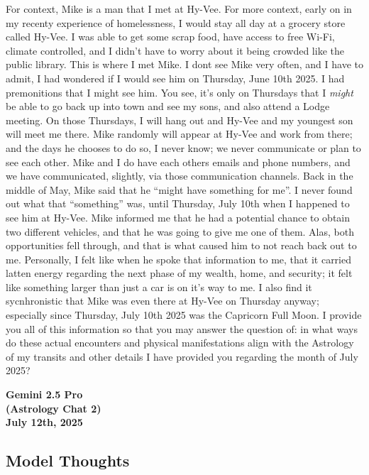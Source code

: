 \documentclass{article}
\begin{document}
For context, Mike is a man that I met at Hy-Vee. For more context, early
on in my recenty experience of homelessness, I would stay all day at a
grocery store called Hy-Vee. I was able to get some scrap food, have
access to free Wi-Fi, climate controlled, and I didn't have to worry
about it being crowded like the public library. This is where I met
Mike. I dont see Mike very often, and I have to admit, I had wondered if
I would see him on Thursday, June 10th 2025. I had premonitions that I
might see him. You see, it's only on Thursdays that I \emph{might} be
able to go back up into town and see my sons, and also attend a Lodge
meeting. On those Thursdays, I will hang out and Hy-Vee and my youngest
son will meet me there. Mike randomly will appear at Hy-Vee and work
from there; and the days he chooses to do so, I never know; we never
communicate or plan to see each other. Mike and I do have each others
emails and phone numbers, and we have communicated, slightly, via those
communication channels. Back in the middle of May, Mike said that he
``might have something for me''. I never found out what that
``something'' was, until Thursday, July 10th when I happened to see him
at Hy-Vee. Mike informed me that he had a potential chance to obtain two
different vehicles, and that he was going to give me one of them. Alas,
both opportunities fell through, and that is what caused him to not
reach back out to me. Personally, I felt like when he spoke that
information to me, that it carried latten energy regarding the next
phase of my wealth, home, and security; it felt like something larger
than just a car is on it's way to me. I also find it sycnhronistic that
Mike was even there at Hy-Vee on Thursday anyway; especially since
Thursday, July 10th 2025 was the Capricorn Full Moon. I provide you all
of this information so that you may answer the question of: in what ways
do these actual encounters and physical manifestations align with the
Astrology of my transits and other details I have provided you regarding
the month of July 2025?

\begin{center}
\textbf{Gemini 2.5 Pro} \\
\textbf{(Astrology Chat 2)} \\
\textbf{July 12th, 2025}
\end{center}

\medskip

\subsection*{Model Thoughts}\label{model-thoughts}
\end{document}
